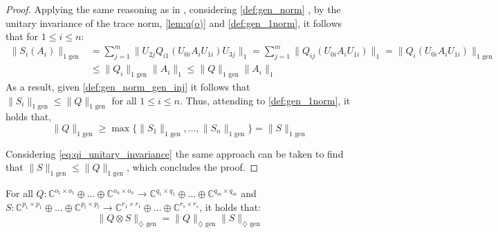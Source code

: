 \begin{proof}
Applying the same reasoning as in \cite[Proof of Proposition 3.41]{watrous2018theory}, considering \autoref{def:gen_norm} , by the unitary invariance of the trace norm, \autoref{lem:q(o)} and  \autoref{def:gen_1norm}, it follows that for $1 \leq i \leq n$: 
\begin{equation}
  \begin{split}
    \lVert S_i (A_i) \rVert_{1 \text{ gen}} & =   \sum_{j=1}^m  \lVert U_{2j} Q_{i1} (U_{0i} A_i U_{1i} ) U_{3j} \rVert_{1} = \sum_{j=1}^m  \lVert Q_{ij} (U_{0i} A_i U_{1i}) \rVert_{1} = \lVert Q_i (U_{0i} A_i U_{1i}) \rVert_{1 \text{ gen}} \\
    & \leq  \lVert Q_i  \rVert_{1 \text{ gen}} \lVert A_i  \rVert_{1} \leq  \lVert Q  \rVert_{1 \text{ gen}} \lVert A_i  \rVert_{1}  
  \end{split}
\end{equation}
As a result, given \autoref{def:gen_norm_gen_inj} it follows that $\lVert S_i \rVert_{1 \text{ gen}} \leq \lVert Q \rVert_{1 \text{ gen}}$ for all $1 \leq i \leq n$. Thus, attending to \autoref{def:gen_1norm}, it holds that,
\begin{equation}
 \lVert Q  \rVert_{1 \text{ gen}}  \geq \max \{\lVert S_1 \rVert_{1 \text{ gen}}, \ldots, \lVert S_n \rVert_{1 \text{ gen}} \} = \lVert S \rVert_{1 \text{ gen}}
\end{equation}

Considering \autoref{eq:qi_unitary_invariance} the same approach can be taken to find that $ \lVert S  \rVert_{1 \text{ gen}} \leq \lVert Q  \rVert_{1 \text{ gen}} $, which concludes the proof.
\end{proof}

\begin{theorem}
  For all $Q:\mathbb{C}^{o_1 \times o_1} \oplus \ldots \oplus \mathbb{C}^{o_n \times o_n}  \rightarrow \mathbb{C}^{q_1 \times q_1} \oplus \ldots \oplus  \mathbb{C}^{q_m \times q_m}$ and $S: \mathbb{C}^{p_1 \times p_1} \oplus \ldots \oplus  \mathbb{C}^{p_t \times p_t} \rightarrow \mathbb{C}^{r_1 \times r_1} \oplus \ldots \oplus  \mathbb{C}^{r_s \times r_s}$, it holds that:
  \begin{equation}
    \lVert Q \otimes S \rVert_{\diamondsuit \text{ gen}} =  \lVert Q  \rVert_{\diamondsuit \text{ gen}} \lVert S \rVert_{\diamondsuit \text{ gen}}
  \end{equation}
\end{theorem}

